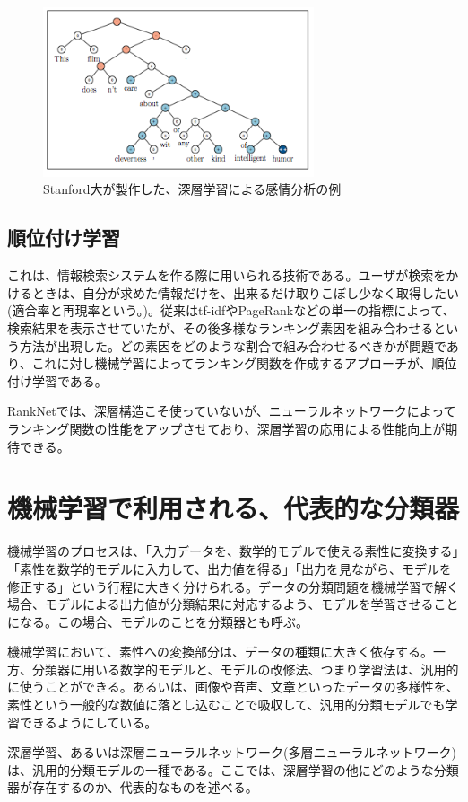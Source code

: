 \begin{figure}[tbp]
 \centering
  \includegraphics[width=80mm]{img/c2/rntn_ex}
 \caption{Stanford大が製作した、深層学習による感情分析の例}
 \label{c2_rntn_ex}
\end{figure}

\subsection{順位付け学習}
これは、情報検索システムを作る際に用いられる技術である。ユーザが検索をかけるときは、自分が求めた情報だけを、出来るだけ取りこぼし少なく取得したい(適合率と再現率という。\cite{tsujii1999joho})。従来はtf-idfやPageRank\cite{brin1998anatomy}\cite{page1999pagerank}などの単一の指標によって、検索結果を表示させていたが、その後多様なランキング素因を組み合わせるという方法が出現した。どの素因をどのような割合で組み合わせるべきかが問題であり、これに対し機械学習によってランキング関数を作成するアプローチが、順位付け学習である。\par
RankNet\cite{burges2005learning}では、深層構造こそ使っていないが、ニューラルネットワークによってランキング関数の性能をアップさせており、深層学習の応用による性能向上が期待できる。

\section{機械学習で利用される、代表的な分類器}
機械学習のプロセスは、「入力データを、数学的モデルで使える素性に変換する」「素性を数学的モデルに入力して、出力値を得る」「出力を見ながら、モデルを修正する」という行程に大きく分けられる。データの分類問題を機械学習で解く場合、モデルによる出力値が分類結果に対応するよう、モデルを学習させることになる。この場合、モデルのことを分類器とも呼ぶ。\par
機械学習において、素性への変換部分は、データの種類に大きく依存する。一方、分類器に用いる数学的モデルと、モデルの改修法、つまり学習法は、汎用的に使うことができる。あるいは、画像や音声、文章といったデータの多様性を、素性という一般的な数値に落とし込むことで吸収して、汎用的分類モデルでも学習できるようにしている。\par
深層学習、あるいは深層ニューラルネットワーク(多層ニューラルネットワーク)は、汎用的分類モデルの一種である。ここでは、深層学習の他にどのような分類器が存在するのか、代表的なものを述べる。

